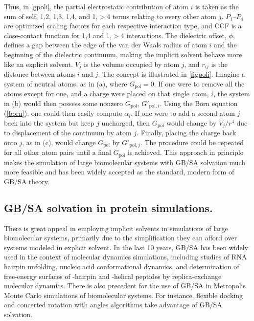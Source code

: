 \documentclass[12pt]{report}
\begin{document}
Thus, in \cref{gpoli}, the partial electrostatic contribution of atom $i$ is taken as the sum of self, 1,2, 1,3, 1,4, and 1,$>$4 terms relating to every other atom $j$. $P_{1}$--$P_{4}$ are optimized scaling factors for each respective interaction type, and CCF is a close-contact function for 1,4 and 1,$>$4 interactions. The dielectric offset, $\phi$, defines a gap between the edge of the van der Waals radius of atom $i$ and the beginning of the dielectric continuum, making the implicit solvent behave more like an explicit solvent. $V_{j}$ is the volume occupied by atom $j$, and $r_{ij}$ is the distance between atoms $i$ and $j$. The concept is illustrated in \cref{figpoli}. Imagine a system of neutral atoms, as in (a), where $G_{\textrm{pol}} = 0$. If one were to remove all the atoms except for one, and a charge were placed on that single atom, $i$, the system in (b) would then possess some nonzero $G_{\textrm{pol}}$, $G'_{\textrm{pol},i}$. Using the Born equation (\cref{born}), one could then easily compute $\alpha_{i}$. If one were to add a second atom $j$ back into the system but keep $j$ uncharged, then $G_{\textrm{pol}}$ would change by $V_{j}/r^{4}$ due to displacement of the continuum by atom $j$. Finally, placing the charge back onto $j$, as in (c), would change $G_{\textrm{pol}}$ by $G'_{\textrm{pol},j}$. The procedure could be repeated for all other atom pairs until a final $G_{\textrm{pol}}$ is achieved. This approach in principle makes the simulation of large biomolecular systems with GB/SA solvation much more feasible and has been widely accepted as the standard, modern form of GB/SA theory. \cite{jorg2005, jorg2004}


\subsection{GB/SA solvation in protein simulations.}

There is great appeal in employing implicit solvents in simulations of large biomolecular systems, \cite{bashford} primarily due to the simplification they can afford over systems modeled in explicit solvent. In the last 10 years, GB/SA has been widely used in the context of molecular dynamics simulations, including studies of RNA hairpin unfolding,\cite{sorin1} nucleic acid conformational dynamics,\cite{sorin2} and determination of free-energy surfaces of \textbeta-hairpin and \textalpha-helical peptides by replica-exchange molecular dynamics.\cite{felts} There is also precedent for the use of GB/SA in Metropolis\cite{metropolis} Monte Carlo simulations of biomolecular systems. For instance, flexible docking\cite{taylor} and concerted rotation with angles\cite{ulmschneider1, ulmschneider2} algorithms take advantage of GB/SA solvation.
\end{document}
